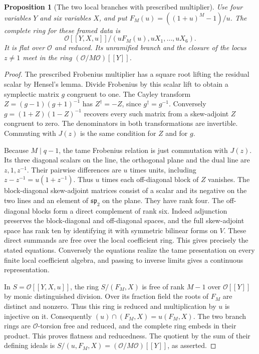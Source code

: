 \documentclass[a4paper,11pt]{article}
\newtheorem{proposition}{Proposition}[section]
\theoremstyle{definition}
\theoremstyle{remark}
\numberwithin{equation}{section}
\begin{document}
\begin{proposition}[The two local branches with prescribed multiplier]
\leavevmode\label{prop:pairedchart651}
Use four variables \(Y\) and six variables \(X\), and put
\(F_M(u)=((1+u)^M-1)/u\).
The complete ring for these framed data is
\[
 \mathcal O[[Y,X,u]]/(uF_M(u),uX_1,\ldots,uX_6).
\]
It is flat over \(\mathcal O\) and reduced. Its unramified
branch and the closure of the locus \(z\ne1\) meet in the
ring \((\mathcal O/M\mathcal O)[[Y]]\).
\end{proposition}
\begin{proof}
The prescribed Frobenius multiplier has a square root lifting
the residual scalar by Hensel's lemma. Divide Frobenius by
this scalar lift to obtain a symplectic matrix \(g\) congruent
to one. The Cayley transform
\(Z=(g-1)(g+1)^{-1}\) has \(Z^\dagger=-Z\), since
\(g^\dagger=g^{-1}\). Conversely \(g=(1+Z)(1-Z)^{-1}\)
recovers every such matrix from a skew-adjoint \(Z\)
congruent to zero. The denominators in both transformations
are invertible. Commuting with \(J(z)\) is the same condition
for \(Z\) and for \(g\).

Because \(M\mid q-1\), the tame Frobenius relation is just
commutation with \(J(z)\). Its three diagonal scalars on the
line, the orthogonal plane and the dual line are \(z,1,z^{-1}\).
Their pairwise differences are \(u\) times units, including
\(z-z^{-1}=u(1+z^{-1})\). Thus \(u\) times each off-diagonal
block of \(Z\) vanishes. The block-diagonal skew-adjoint
matrices consist of a scalar and its negative on the two
lines and an element of \(\mathfrak{sp}_2\) on the plane.
They have rank four. The off-diagonal blocks form a direct
complement of rank six. Indeed adjunction preserves the
block-diagonal and off-diagonal spaces, and the full
skew-adjoint space has rank ten by identifying it with
symmetric bilinear forms on \(V\). These direct summands are
free over the local coefficient ring. This gives precisely the
stated equations. Conversely the equations realize the tame
presentation on every finite local coefficient algebra, and
passing to inverse limits gives a continuous representation.

In \(S=\mathcal O[[Y,X,u]]\), the ring \(S/(F_M,X)\)
is free of rank \(M-1\) over \(\mathcal O[[Y]]\) by monic
distinguished division. Over its fraction field the roots of
\(F_M\) are distinct and nonzero. Thus this ring is reduced
and multiplication by \(u\) is injective on it. Consequently
\((u)\cap(F_M,X)=u(F_M,X)\). The two branch rings are
\(\mathcal O\)-torsion free and reduced, and the complete ring
embeds in their product. This proves flatness and reducedness.
The quotient by the sum of their defining ideals is
\(S/(u,F_M,X)=(\mathcal O/M\mathcal O)[[Y]]\), as asserted.
\end{proof}
\end{document}
